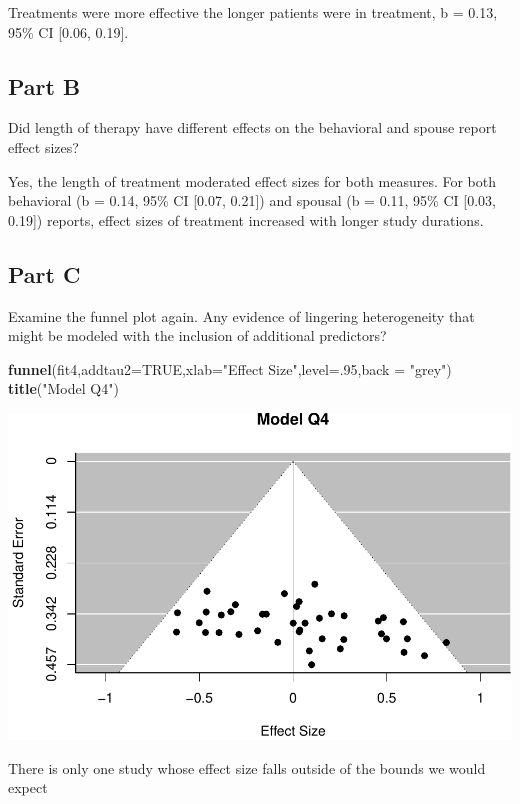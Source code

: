 \documentclass[]{article}
\newenvironment{Shaded}{\begin{snugshade}}{\end{snugshade}}
\newcommand{\KeywordTok}[1]{\textcolor[rgb]{0.13,0.29,0.53}{\textbf{#1}}}
\newcommand{\DataTypeTok}[1]{\textcolor[rgb]{0.13,0.29,0.53}{#1}}
\newcommand{\DecValTok}[1]{\textcolor[rgb]{0.00,0.00,0.81}{#1}}
\newcommand{\StringTok}[1]{\textcolor[rgb]{0.31,0.60,0.02}{#1}}
\newcommand{\OtherTok}[1]{\textcolor[rgb]{0.56,0.35,0.01}{#1}}
\newcommand{\NormalTok}[1]{#1}
\begin{document}
Treatments were more effective the longer patients were in treatment, b
= 0.13, 95\% CI {[}0.06, 0.19{]}.

\subsection{Part B}\label{part-b-3}

Did length of therapy have different effects on the behavioral and
spouse report effect sizes?

Yes, the length of treatment moderated effect sizes for both measures.
For both behavioral (b = 0.14, 95\% CI {[}0.07, 0.21{]}) and spousal (b
= 0.11, 95\% CI {[}0.03, 0.19{]}) reports, effect sizes of treatment
increased with longer study durations.

\subsection{Part C}\label{part-c-2}

Examine the funnel plot again. Any evidence of lingering heterogeneity
that might be modeled with the inclusion of additional predictors?

\begin{Shaded}
\begin{Highlighting}[]
\KeywordTok{funnel}\NormalTok{(fit4,}\DataTypeTok{addtau2=}\OtherTok{TRUE}\NormalTok{,}\DataTypeTok{xlab=}\StringTok{"Effect Size"}\NormalTok{,}\DataTypeTok{level=}\NormalTok{.}\DecValTok{95}\NormalTok{,}\DataTypeTok{back =} \StringTok{"grey"}\NormalTok{)}
\KeywordTok{title}\NormalTok{(}\StringTok{"Model Q4"}\NormalTok{)}
\end{Highlighting}
\end{Shaded}

\begin{center}\includegraphics{Beck_HW_9_files/figure-latex/unnamed-chunk-13-1} \end{center}

There is only one study whose effect size falls outside of the bounds we
would expect
\end{document}
